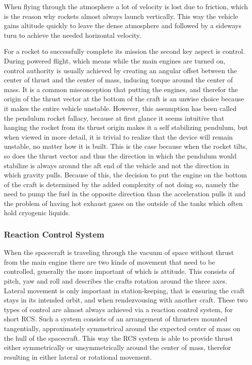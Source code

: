 When flying through the atmosphere a lot of velocity is lost due to friction, which is the reason why rockets almost always launch vertically. This way the vehicle gains altitude quickly to leave the dense atmosphere and followed by a sideways turn to achieve the needed horizontal velocity.

For a rocket to successfully complete its mission the second key aspect is control. During powered flight, which means while the main engines are turned on, control authority is usually achieved by creating an angular offset between the center of thrust and the center of mass, inducing torque around the center of mass. It is a common misconception that putting the engines, and therefor the origin of the thrust vector at the bottom of the craft is an unwise choice because it makes the entire vehicle unstable. However, this assumption has been called the pendulum rocket fallacy, because at first glance it seems intuitive that hanging the rocket from its thrust origin makes it a self stabilizing pendulum, but when viewed in more detail, it is trivial to realize that the device will remain unstable, no matter how it is built. This is the case because when the rocket tilts, so does the thrust vector and thus the direction in which the pendulum would stabilize is always around the aft end of the vehicle and not the direction in which gravity pulls. Because of this, the decision to put the engine on the bottom of the craft is determined by the added complexity of not doing so, namely the need to pump the fuel in the opposite direction than the acceleration pulls it and the problem of having hot exhaust gases on the outside of the tanks which often hold cryogenic liquids.

\subsubsection{Reaction Control System}

When the spacecraft is traveling through the vacuum of space without thrust from the main engine there are two kinds of movement that need to be controlled, generally the more important of which is attitude. This consists of pitch, yaw and roll and describes the crafts rotation around the three axes. Lateral movement is only important in station-keeping, that is ensuring the craft stays in its intended orbit, and when rendezvousing with another craft. These two types of control are almost always achieved via a reaction control system, for short RCS. Such a system consists of an arrangement of thrusters mounted tangentially, approximately symmetrical around the expected center of mass on the hull of the spacecraft. This way the RCS system is able to provide thrust either symmetrically or unsymmetrically around the center of mass, therefor resulting in either lateral or rotational movement.


